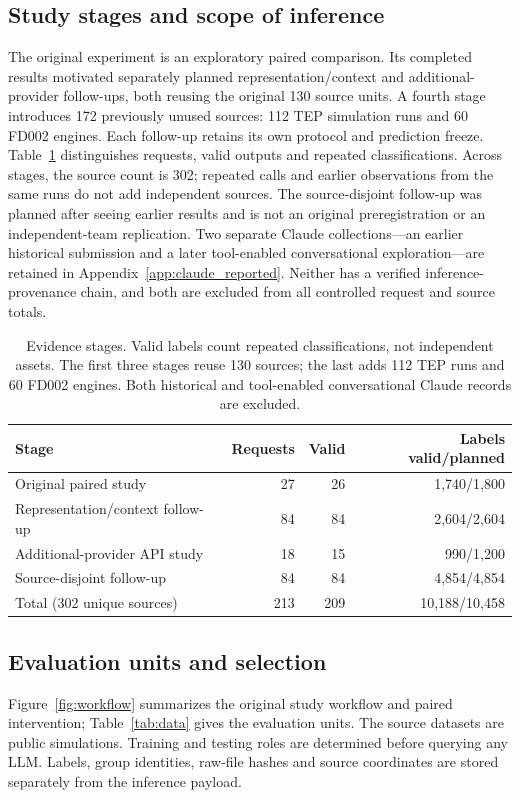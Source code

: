 \documentclass[11pt,a4paper]{article}
\begin{document}
\subsection{Study stages and scope of inference}
The original experiment is an exploratory paired comparison. Its completed results motivated separately planned representation/context and additional-provider follow-ups, both reusing the original 130 source units. A fourth stage introduces 172 previously unused sources: 112 TEP simulation runs and 60 FD002 engines. Each follow-up retains its own protocol and prediction freeze. Table~\ref{tab:stages} distinguishes requests, valid outputs and repeated classifications. Across stages, the source count is 302; repeated calls and earlier observations from the same runs do not add independent sources. The source-disjoint follow-up was planned after seeing earlier results and is not an original preregistration or an independent-team replication. Two separate Claude collections---an earlier historical submission and a later tool-enabled conversational exploration---are retained in Appendix~\ref{app:claude_reported}. Neither has a verified inference-provenance chain, and both are excluded from all controlled request and source totals.

\begin{table}[htbp]
\centering
\small
\caption{Evidence stages. Valid labels count repeated classifications, not independent assets. The first three stages reuse 130 sources; the last adds 112 TEP runs and 60 FD002 engines. Both historical and tool-enabled conversational Claude records are excluded.}
\label{tab:stages}
\begin{tabular}{@{}lrrr@{}}
\toprule
Stage & Requests & Valid & Labels valid/planned \\
\midrule
Original paired study & 27 & 26 & 1,740/1,800 \\
Representation/context follow-up & 84 & 84 & 2,604/2,604 \\
Additional-provider API study & 18 & 15 & 990/1,200 \\
Source-disjoint follow-up & 84 & 84 & 4,854/4,854 \\
Total (302 unique sources) & 213 & 209 & 10,188/10,458 \\
\bottomrule
\end{tabular}
\end{table}


\subsection{Evaluation units and selection}
Figure~\ref{fig:workflow} summarizes the original study workflow and paired intervention; Table~\ref{tab:data} gives the evaluation units. The source datasets are public simulations. Training and testing roles are determined before querying any LLM. Labels, group identities, raw-file hashes and source coordinates are stored separately from the inference payload.
\end{document}
